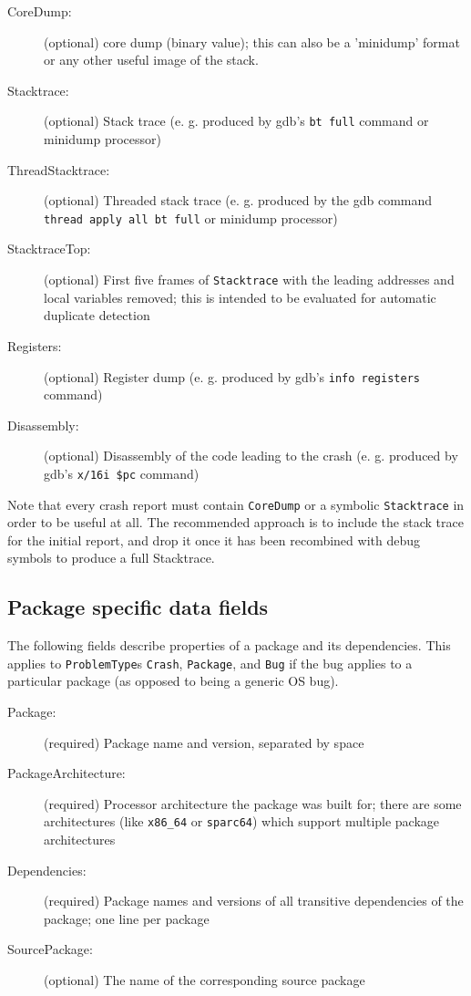 \documentclass[DIV12,halfparskip]{scrartcl}
\begin{document}
\begin{description}
    \item [CoreDump:] (optional) core dump (binary value); this can also be a
    'minidump' format or any other useful image of the stack.

    \item [Stacktrace:] (optional) Stack trace (e. g. produced by gdb's
    \verb!bt full! command or minidump processor)

    \item [ThreadStacktrace:] (optional) Threaded stack trace (e. g. produced
    by the gdb command \verb!thread apply all bt full! or minidump processor)

    \item [StacktraceTop:] (optional) First five frames of \verb!Stacktrace!
    with the leading addresses and local variables removed; this is intended to
    be evaluated for automatic duplicate detection 

    \item [Registers:] (optional) Register dump (e. g. produced by gdb's 
    \verb!info registers! command)

    \item [Disassembly:] (optional) Disassembly of the code leading to the
    crash (e. g. produced by gdb's \verb!x/16i $pc! command)
\end{description}

Note that every crash report must contain \verb!CoreDump! or a symbolic
\verb!Stacktrace! in order to be useful at all. The recommended approach is to
include the stack trace for the initial report, and drop it once it has been
recombined with debug symbols to produce a full Stacktrace.

\subsection{Package specific data fields}

The following fields describe properties of a package and its dependencies.
This applies to \verb!ProblemType!s \verb!Crash!, \verb!Package!, and
\verb!Bug! if the bug applies to a particular package (as opposed to being a
generic OS bug).

\begin{description}
    \item [Package:] (required) Package name and version, separated by space

    \item [PackageArchitecture:] (required) Processor architecture the package
    was built for; there are some architectures (like \verb!x86_64! or
    \verb!sparc64!) which support multiple package architectures

    \item [Dependencies:] (required) Package names and versions of all
    transitive dependencies of the package; one line per package

    \item [SourcePackage:] (optional) The name of the corresponding source package
\end{description}
\end{document}
